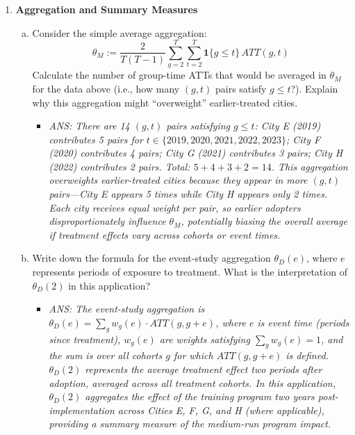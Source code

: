 \documentclass[12pt,a4paper]{article}
\newcommand{\ans}[1]{\begin{itemize}\item[$\bullet$] \textit{ANS: #1}\end{itemize}}
\begin{document}
\begin{enumerate}
\begin{enumerate}[(a)]
\item Suppose you wanted to estimate $ATT(2019, 2023)$ for City E. Which cities could serve as valid ``not-yet-treated'' comparison groups in 2023? Explain your reasoning. What does this imply about the availability of comparison groups over time?
\ans{No cities can serve as not-yet-treated comparison groups in 2023. By 2023, all cities except I have been treated: F (2020), G (2021), and H (2022) are all already treated. Only City I remains, but it is never-treated, not not-yet-treated. This illustrates a fundamental challenge in staggered adoption designs: the pool of not-yet-treated comparison units shrinks over time as more cohorts adopt treatment. Later time periods have fewer valid comparison units, potentially reducing precision and making parallel trends less credible for long-run effects.}
\end{enumerate}

\item \textbf{Aggregation and Summary Measures}
\begin{enumerate}[(a)]
\item Consider the simple average aggregation:
\begin{equation*}
\theta_M := \frac{2}{T(T-1)}\sum_{g=2}^{T}\sum_{t=2}^{T}\mathbf{1}\{g \leq t\}\,ATT(g, t)
\end{equation*}
Calculate the number of group-time ATTs that would be averaged in $\theta_M$ for the data above (i.e., how many $(g, t)$ pairs satisfy $g \leq t$?). Explain why this aggregation might ``overweight'' earlier-treated cities.
\ans{There are 14 $(g, t)$ pairs satisfying $g \leq t$: City E (2019) contributes 5 pairs for $t \in \{2019, 2020, 2021, 2022, 2023\}$; City F (2020) contributes 4 pairs; City G (2021) contributes 3 pairs; City H (2022) contributes 2 pairs. Total: $5 + 4 + 3 + 2 = 14$. This aggregation overweights earlier-treated cities because they appear in more $(g, t)$ pairs---City E appears 5 times while City H appears only 2 times. Each city receives equal weight per pair, so earlier adopters disproportionately influence $\theta_M$, potentially biasing the overall average if treatment effects vary across cohorts or event times.}

\item Write down the formula for the event-study aggregation $\theta_D(e)$, where $e$ represents periods of exposure to treatment. What is the interpretation of $\theta_D(2)$ in this application?
\ans{The event-study aggregation is $\theta_D(e) = \sum_{g} w_g(e) \cdot ATT(g, g+e)$, where $e$ is event time (periods since treatment), $w_g(e)$ are weights satisfying $\sum_{g} w_g(e) = 1$, and the sum is over all cohorts $g$ for which $ATT(g, g+e)$ is defined. $\theta_D(2)$ represents the average treatment effect two periods after adoption, averaged across all treatment cohorts. In this application, $\theta_D(2)$ aggregates the effect of the training program two years post-implementation across Cities E, F, G, and H (where applicable), providing a summary measure of the medium-run program impact.}


\end{enumerate}
\end{enumerate}
\end{document}
